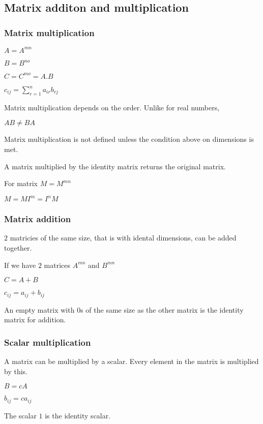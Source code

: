 
\subsection{Matrix additon and multiplication}

\subsubsection{Matrix multiplication}

$A=A^{mn}$

$B=B^{no}$

$C=C^{mo}=A.B$

$c_{ij}=\sum_{r=1}^na_{ir}b_{rj}$

Matrix multiplication depends on the order. Unlike for real numbers, 

$AB\ne BA$

Matrix multiplication is not defined unless the condition above on dimensions is met.

A matrix multiplied by the identity matrix returns the original matrix.

For matrix \(M=M^{mn}\)

$M=MI^m=I^nM$

\subsubsection{Matrix addition}

\(2\) matricies of the same size, that is with idental dimensions, can be added together.

If we have \(2\) matrices \(A^{mn}\) and \(B^{mn}\)

$C=A+B$

$c_{ij}=a_{ij}+b_{ij}$

An empty matrix with \(0\)s of the same size as the other matrix is the identity matrix for addition.

\subsubsection{Scalar multiplication}

A matrix can be multiplied by a scalar. Every element in the matrix is multiplied by this.

$B=cA$

$b_{ij}=ca_{ij}$

The scalar \(1\) is the identity scalar.

